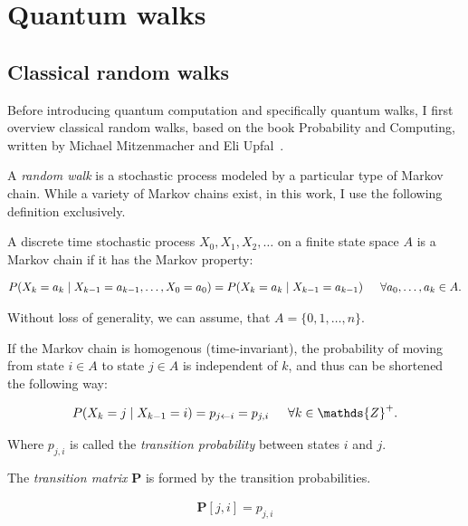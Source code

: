\section{Quantum walks}

\subsection{Classical random walks}

Before introducing quantum computation and specifically quantum walks, I first overview classical random walks, based on the book Probability and Computing, written by Michael Mitzenmacher and Eli Upfal~\cite{MitzenmacherProbability}.

A \textit{random walk} is a stochastic process modeled by a particular type of Markov chain. While a variety of Markov chains exist, in this work, I use the following definition exclusively.

\begin{definition}

A discrete time stochastic process $X_0, X_1, X_2, \dots$ on a finite state space $A$ is a Markov chain if it has the Markov property:

\begin{align*}
P(X_k = a_k \mid X_{k-1} = a_{k-1}, \dots, X_0 = a_0) = P(X_k = a_k \mid X_{k-1} = a_{k-1}) \hspace{15pt} \forall a_0,\dots,a_k\in A.
\end{align*}

\end{definition}

Without loss of generality, we can assume, that $A = \{0,1,\dots,n\}$.

If the Markov chain is homogenous (time-invariant), the probability of moving from state $i \in A$ to state $j \in A$ is independent of $k$, and thus can be shortened the following way:

\begin{align*}
P(X_k = j \mid X_{k-1} = i) = p_{j\leftarrow{}i} = p_{j,i} \addspace \forall k \in \mathds{Z}^+.
\end{align*}

Where $p_{j,i}$ is called the \textit{transition probability} between states $i$ and $j$.

The \textit{transition matrix} $\mathbf{P}$ is formed by the transition probabilities.

\begin{align*}
    \mathbf{P}[j,i] = p_{j,i} 
\end{align*}

